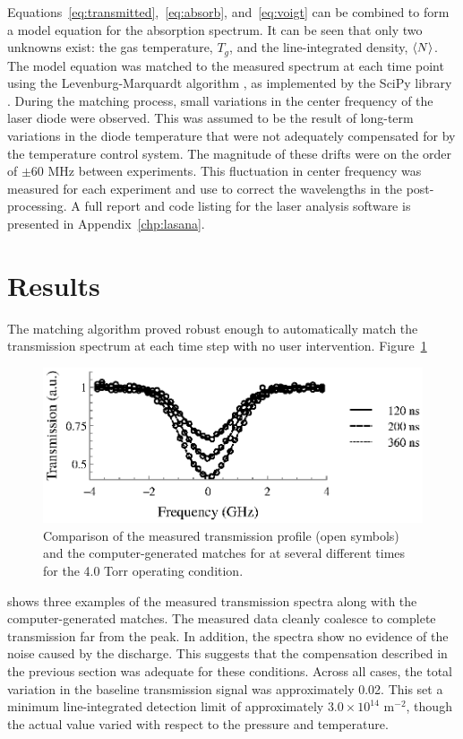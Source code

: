 Equations~\ref{eq:transmitted},~\ref{eq:absorb}, and~\ref{eq:voigt} can be
combined to form a model equation for the absorption spectrum. It can be seen
that only two unknowns exist: the gas temperature, $T_g$, and the
line-integrated density, $\langle N \rangle$. The model equation was matched to the measured
spectrum at each time point using the Levenburg-Marquardt algorithm
\cite{Marquardt1963}, as implemented by the SciPy library \cite{Jones2001}.
During the matching process, small variations in the center frequency of the
laser diode were observed. This was assumed to be the result of long-term
variations in the diode temperature that were not adequately compensated for by
the temperature control system. The magnitude of these drifts were on the order
of $\pm60$ MHz between experiments. This fluctuation in center frequency was
measured for each experiment and use to correct the wavelengths in the
post-processing. A full report and code listing for the laser analysis software
is presented in Appendix~\ref{chp:lasana}.

\section{Results}

The matching algorithm proved robust enough to automatically match the
transmission spectrum at each time step with no user intervention.
Figure~\ref{fig:matching}
\begin{figure}
  \centering
  \includegraphics{./chapters/metastables/figures/matching.eps}
  \caption{Comparison of the measured transmission profile (open symbols) and
  the computer-generated matches for at several different times for the 4.0 Torr
  operating condition.}
  \label{fig:matching}
\end{figure}
shows three examples of the measured transmission spectra along with the
computer-generated matches. The measured data cleanly coalesce to complete
transmission far from the peak. In addition, the spectra show no evidence of the
noise caused by the discharge. This suggests that the compensation described in
the previous section was adequate for these conditions. Across all cases, the
total variation in the baseline transmission signal was approximately 0.02. This
set a minimum line-integrated detection limit of approximately $3.0 \times
10^{14}$ m$^{-2}$, though the actual value varied with respect to the pressure
and temperature.

